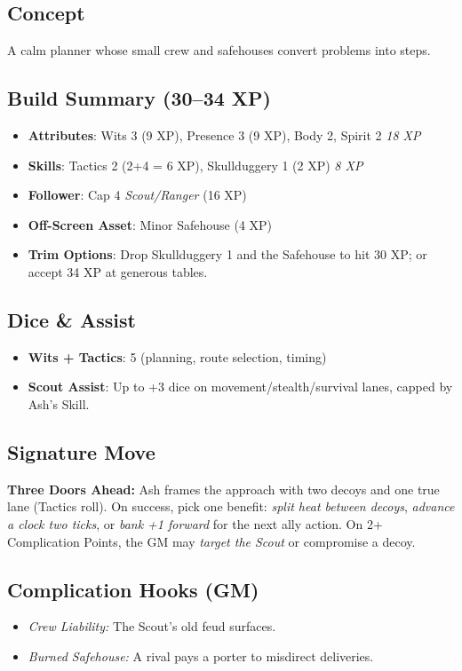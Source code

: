 \documentclass[12pt]{book}
\begin{document}
\subsection*{Concept}
A calm planner whose small crew and safehouses convert problems into steps.

\subsection*{Build Summary (30–34 XP)}
\begin{itemize}
  \item \textbf{Attributes}: Wits 3 (9 XP), Presence 3 (9 XP), Body 2, Spirit 2 \hfill \emph{18 XP}
  \item \textbf{Skills}: Tactics 2 (2+4 = 6 XP), Skullduggery 1 (2 XP) \hfill \emph{8 XP}
  \item \textbf{Follower}: Cap 4 \emph{Scout/Ranger} (16 XP)
  \item \textbf{Off-Screen Asset}: Minor Safehouse (4 XP)
  \item \textbf{Trim Options}: Drop Skullduggery 1 and the Safehouse to hit 30 XP; or accept 34 XP at generous tables.
\end{itemize}

\subsection*{Dice \& Assist}
\begin{itemize}
  \item \textbf{Wits + Tactics}: 5 (planning, route selection, timing)
  \item \textbf{Scout Assist}: Up to +3 dice on movement/stealth/survival lanes, capped by Ash’s Skill.
\end{itemize}

\subsection*{Signature Move}
\textbf{Three Doors Ahead:} Ash frames the approach with two decoys and one true lane (Tactics roll). On success, pick one benefit: \emph{split heat between decoys}, \emph{advance a clock two ticks}, or \emph{bank +1 forward} for the next ally action. On 2+ Complication Points, the GM may \emph{target the Scout} or compromise a decoy.

\subsection*{Complication Hooks (GM)}
\begin{itemize}
  \item \emph{Crew Liability:} The Scout’s old feud surfaces.
  \item \emph{Burned Safehouse:} A rival pays a porter to misdirect deliveries.
\end{itemize}
\end{document}
